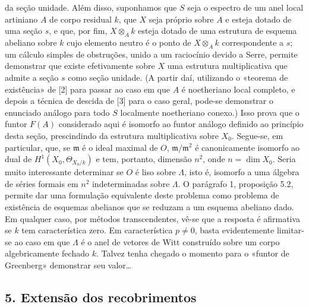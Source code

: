 da seção unidade. Além disso, suponhamos que $S$ seja o espectro de um anel
local artiniano $A$ de corpo residual $k$, que $X$ seja próprio sobre $A$ e esteja
dotado de uma seção $s$, e que, por fim, $X\otimes_Ak$ esteja dotado de uma
estrutura de esquema abeliano sobre $k$ cujo elemento neutro é o ponto de
$X\otimes_Ak$ correspondente a $s$; um cálculo simples de obstruções,
unido a um raciocínio devido a Serre, permite demonstrar que existe
efetivamente sobre $X$ uma estrutura multiplicativa que admite a seção
$s$ como seção unidade. (A partir daí, utilizando o «teorema de
existência» de [2] para passar ao caso em que $A$ é noetheriano local completo,
e depois a técnica de descida de [3] para o caso geral, pode-se demonstrar
o enunciado análogo para todo $S$ localmente noetheriano conexo.) Isso prova
que o funtor $F(A)$ considerado aqui é isomorfo ao funtor análogo definido ao
princípio desta seção, prescindindo da estrutura multiplicativa sobre
$X_0$. Segue-se, em particular, que, se $\mathfrak m$ é o ideal maximal de
$O$, $\mathfrak m/\mathfrak m^2$ é canonicamente isomorfo ao dual de
$H^1(X_0,\Theta_{X_0/k})$ e tem, portanto, dimensão $n^2$, onde
$n=\dim X_0$. Seria muito interessante determinar se $O$ é liso sobre $\Lambda$,
isto é, isomorfo a uma álgebra de séries formais em $n^2$ indeterminadas
sobre $\Lambda$. O parágrafo 1, proposição 5.2, permite dar uma formulação
equivalente deste problema como problema de existência de esquemas abelianos
que se reduzam a um esquema abeliano dado. Em qualquer caso, por métodos
transcendentes, vê-se que a resposta é afirmativa se $k$ tem característica
zero. Em característica $p\ne0$, basta evidentemente limitar-se ao caso em que
$\Lambda$ é o anel de vetores de Witt construído sobre um corpo
algebricamente fechado $k$. Talvez tenha chegado o momento para o «funtor
de Greenberg» demonstrar seu valor\ldots

\subsection*{5. Extensão dos recobrimentos}

